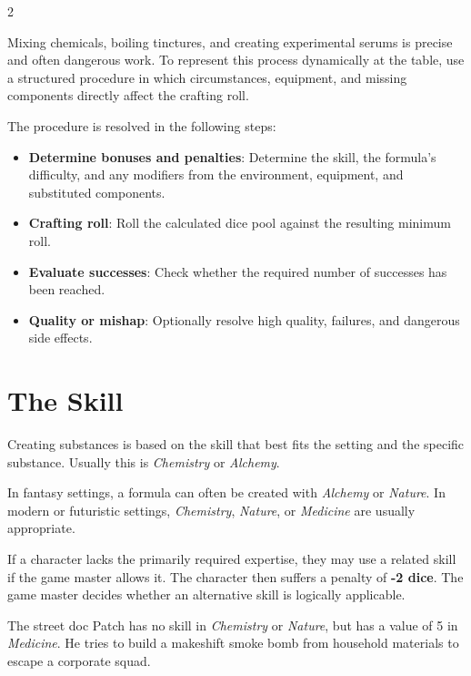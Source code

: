 \label{ch:brewing}

\begin{multicols}{2}

Mixing chemicals, boiling tinctures, and creating experimental serums is precise and often dangerous work. To represent this process dynamically at the table, use a structured procedure in which circumstances, equipment, and missing components directly affect the crafting roll.

The procedure is resolved in the following steps:
\begin{itemize}
    \item \textbf{Determine bonuses and penalties}: Determine the skill, the formula's difficulty, and any modifiers from the environment, equipment, and substituted components.
    \item \textbf{Crafting roll}: Roll the calculated dice pool against the resulting minimum roll.
    \item \textbf{Evaluate successes}: Check whether the required number of successes has been reached.
    \item \textbf{Quality or mishap}: Optionally resolve high quality, failures, and dangerous side effects.
\end{itemize}

\section{The Skill}

Creating substances is based on the skill that best fits the setting and the specific substance. Usually this is \textit{Chemistry} or \textit{Alchemy}.

In fantasy settings, a formula can often be created with \textit{Alchemy} or \textit{Nature}. In modern or futuristic settings, \textit{Chemistry}, \textit{Nature}, or \textit{Medicine} are usually appropriate.

If a character lacks the primarily required expertise, they may use a related skill if the game master allows it. The character then suffers a penalty of \textbf{-2 dice}. The game master decides whether an alternative skill is logically applicable.

\begin{pexample}[Example]
The street doc Patch has no skill in \textit{Chemistry} or \textit{Nature}, but has a value of 5 in \textit{Medicine}. He tries to build a makeshift smoke bomb from household materials to escape a corporate squad.


\end{pexample}
\end{multicols}
